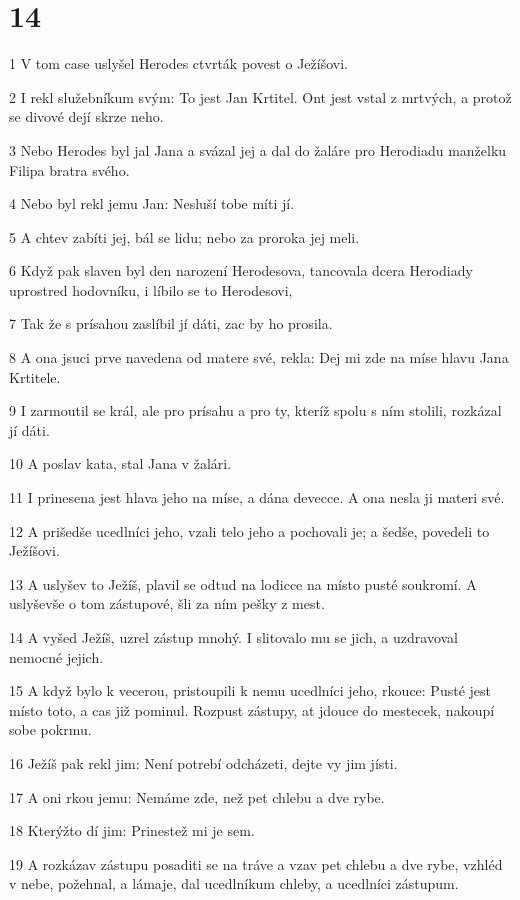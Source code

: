 \chapter{14}

\par 1 V tom case uslyšel Herodes ctvrták povest o Ježíšovi.
\par 2 I rekl služebníkum svým: To jest Jan Krtitel. Ont jest vstal z mrtvých, a protož se divové dejí skrze neho.
\par 3 Nebo Herodes byl jal Jana a svázal jej a dal do žaláre pro Herodiadu manželku Filipa bratra svého.
\par 4 Nebo byl rekl jemu Jan: Nesluší tobe míti jí.
\par 5 A chtev zabíti jej, bál se lidu; nebo za proroka jej meli.
\par 6 Když pak slaven byl den narození Herodesova, tancovala dcera Herodiady uprostred hodovníku, i líbilo se to Herodesovi,
\par 7 Tak že s prísahou zaslíbil jí dáti, zac by ho prosila.
\par 8 A ona jsuci prve navedena od matere své, rekla: Dej mi zde na míse hlavu Jana Krtitele.
\par 9 I zarmoutil se král, ale pro prísahu a pro ty, kteríž spolu s ním stolili, rozkázal jí dáti.
\par 10 A poslav kata, stal Jana v žalári.
\par 11 I prinesena jest hlava jeho na míse, a dána devecce. A ona nesla ji materi své.
\par 12 A prišedše ucedlníci jeho, vzali telo jeho a pochovali je; a šedše, povedeli to Ježíšovi.
\par 13 A uslyšev to Ježíš, plavil se odtud na lodicce na místo pusté soukromí. A uslyševše o tom zástupové, šli za ním pešky z mest.
\par 14 A vyšed Ježíš, uzrel zástup mnohý. I slitovalo mu se jich, a uzdravoval nemocné jejich.
\par 15 A když bylo k vecerou, pristoupili k nemu ucedlníci jeho, rkouce: Pusté jest místo toto, a cas již pominul. Rozpust zástupy, at jdouce do mestecek, nakoupí sobe pokrmu.
\par 16 Ježíš pak rekl jim: Není potrebí odcházeti, dejte vy jim jísti.
\par 17 A oni rkou jemu: Nemáme zde, než pet chlebu a dve rybe.
\par 18 Kterýžto dí jim: Prinestež mi je sem.
\par 19 A rozkázav zástupu posaditi se na tráve a vzav pet chlebu a dve rybe, vzhléd v nebe, požehnal, a lámaje, dal ucedlníkum chleby, a ucedlníci zástupum.

